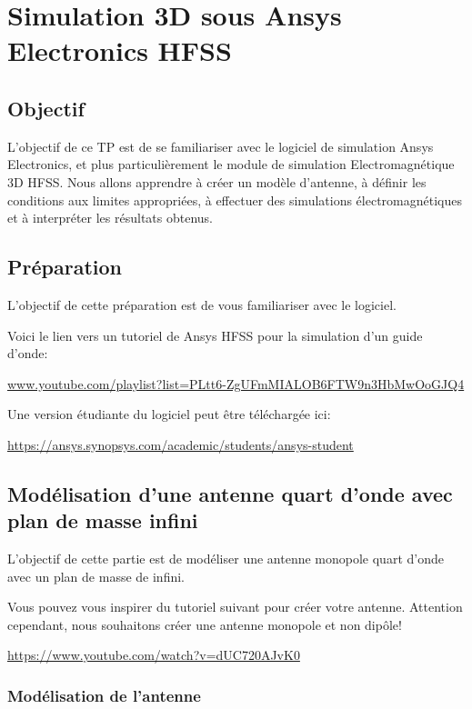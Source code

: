 \chapter{Simulation 3D sous Ansys Electronics HFSS}

\section{Objectif}

L'objectif de ce TP est de se familiariser avec le logiciel de simulation Ansys Electronics, et plus particulièrement le module de simulation Electromagnétique 3D HFSS\@. Nous allons apprendre à créer un modèle d'antenne, à définir les conditions aux limites appropriées, à effectuer des simulations électromagnétiques et à interpréter les résultats obtenus.

\section{Préparation}

L'objectif de cette préparation est de vous familiariser avec le logiciel. 

Voici le lien vers un tutoriel de Ansys HFSS pour la simulation d'un guide d'onde:

\href{www.youtube.com/playlist?list=PLtt6-ZgUFmMIALOB6FTW9n3HbMwOoGJQ4}{www.youtube.com/playlist?list=PLtt6-ZgUFmMIALOB6FTW9n3HbMwOoGJQ4}

\vspace{0.5cm}
Une version étudiante du logiciel peut être téléchargée ici:

\href{https://ansys.synopsys.com/academic/students/ansys-student}{https://ansys.synopsys.com/academic/students/ansys-student}
\section{Modélisation d'une antenne quart d'onde avec plan de masse infini}

L'objectif de cette partie est de modéliser une antenne monopole quart d'onde avec un plan de masse de infini.

Vous pouvez vous inspirer du tutoriel suivant pour créer votre antenne. Attention cependant, nous souhaitons créer une antenne monopole et non dipôle!

\href{https://www.youtube.com/watch?v=dUC720AJvK0}{https://www.youtube.com/watch?v=dUC720AJvK0}

\subsection{Modélisation de l'antenne}

